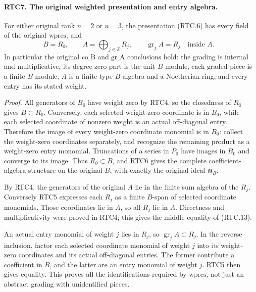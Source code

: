 \paragraph{RTC7. The original weighted presentation and entry algebra.}
\label{claim:RTC7}
For either original rank \(n=2\) or \(n=3\), the presentation
(RTC.6) has every field of the original \(\mathrm{wpres}\), and
\[
 B=R_0,\qquad A=\bigoplus_{j\in\mathbb Z}R_j,
       \qquad \operatorname{gr}_jA=R_j\quad\text{inside }A.
                                                        \tag{RTC.13}
\]
In particular the original \(\mathrm{co\_B}\) and
\(\mathrm{gr\_A}\) conclusions hold: the grading is internal
and multiplicative, its degree-zero part is the unit \(B\)-module,
each graded piece is a finite \(B\)-module, \(A\) is a finite
type \(B\)-algebra and a Noetherian ring, and every entry has
its stated weight.

\emph{Proof.}
All generators of \(B_0\) have weight zero by RTC4, so the
closedness of \(R_0\) gives \(B\subset R_0\).  Conversely,
each selected weight-zero coordinate is in \(B_0\), while each
selected coordinate of nonzero weight is an actual off-diagonal
entry.  Therefore the image of every weight-zero coordinate monomial
is in \(B_0\): collect the weight-zero coordinates separately,
and recognize the remaining product as a weight-zero entry monomial.
Truncations of a series in \(P_0\) have images in \(B_0\) and
converge to its image.  Thus \(R_0\subset B\), and RTC6 gives
the complete coefficient-algebra structure on the original \(B\),
with exactly the original ideal \(\mathfrak m_B\).

By RTC4, the generators of the original \(A\) lie in the finite
sum algebra of the \(R_j\).  Conversely RTC5 expresses each
\(R_j\) as a finite \(B\)-span of selected coordinate monomials.
Those coordinates lie in \(A\), so all \(R_j\) lie in \(A\).
Directness and multiplicativity were proved in RTC4; this gives
the middle equality of (RTC.13).

An actual entry monomial of weight \(j\) lies in \(R_j\), so
\(\operatorname{gr}_jA\subset R_j\).  In the reverse inclusion,
factor each selected coordinate monomial of weight \(j\) into
its weight-zero coordinates and its actual off-diagonal entries.
The former contribute a coefficient in \(B\), and the latter
are an entry monomial of weight \(j\).  RTC5 then gives equality.
This proves all the identifications required by \(\mathrm{wpres}\),
not just an abstract grading with unidentified pieces.

